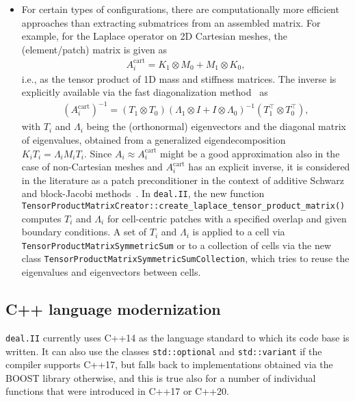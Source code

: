 \documentclass{ansarticle-preprint}
\newcommand{\specialword}[1]{\texttt{#1}}
\newcommand{\dealii}{{\specialword{deal.II}}\xspace}
\begin{document}
\begin{itemize}
  \item For certain types of configurations, there are computationally more efficient
  approaches than extracting submatrices from an assembled matrix. For
  example, for the Laplace
  operator on 2D Cartesian meshes, the (element/patch) matrix is given as
  \begin{align*}
  A_i^{\text{cart}} = K_1 \otimes M_0 + M_1 \otimes K_0,
  \end{align*}
  i.e., as the tensor product of 1D mass and stiffness matrices. The inverse is
  explicitly available via the fast diagonalization method~\cite{lynch1964direct} as
  \begin{align*}
  \left(A_i^{\text{cart}}\right)^{-1} = (T_1 \otimes T_0) (\Lambda_1 \otimes I + I \otimes \Lambda_0)^{-1} (T_1^\top \otimes T_0^\top),
  \end{align*}
  with $T_i$ and $\Lambda_i$ being the (orthonormal) eigenvectors and the diagonal
  matrix of eigenvalues, obtained from a generalized eigendecomposition
  $K_iT_i = \Lambda_i M_i T_i$. Since $A_i \approx A_i^{\text{cart}}$
  might be a good approximation also in the case of non-Cartesian meshes and 
  $A_i^{\text{cart}}$ has an explicit inverse, it is considered in the
  literature as a patch preconditioner in the context of additive
  Schwarz~\cite{witte2021fast, phillips2021auto, couzy1995spectral} and block-Jacobi methods~\cite{kronbichler2019hermite}.
  In \dealii, the new function
  \texttt{Tensor\-Product\-Matrix\-Creator::create\_\allowbreak laplace\_\allowbreak tensor\_\allowbreak product\_\allowbreak matrix()} computes $T_i$ and $\Lambda_i$
  for cell-centric patches with a specified overlap and given boundary conditions.
  A set of $T_i$ and $\Lambda_i$ is applied to a cell via
  \texttt{Tensor\-Product\-Matrix\-Symmetric\-Sum} or to a collection of cells
  via the new class \texttt{Tensor\-Product\-Matrix\-Symmetric\-Sum\-Collection}, which
  tries to reuse the eigenvalues and eigenvectors between cells.
\end{itemize}


\subsection{C++ language modernization}\label{sec:language}

\dealii{} currently uses C++14 as the language standard to which its
code base is written. It can also use the classes
\texttt{std::optional} and \texttt{std::variant} if the compiler
supports C++17, but falls back to implementations obtained via the
BOOST library otherwise, and this is true also for a number of
individual functions that were introduced in C++17 or C++20.
\end{document}
